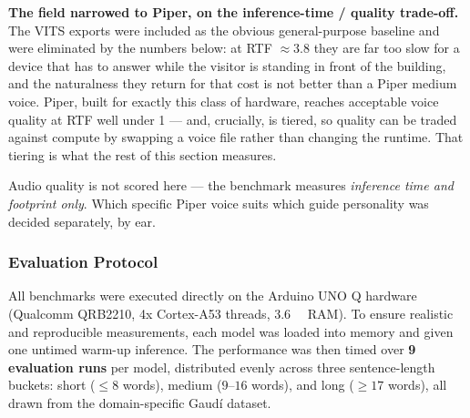 \documentclass[11pt,a4paper]{article}
\begin{document}
\textbf{The field narrowed to Piper, on the inference-time / quality
trade-off.} The VITS exports were included as the obvious general-purpose
baseline and were eliminated by the numbers below: at RTF $\approx 3.8$ they
are far too slow for a device that has to answer while the visitor is standing
in front of the building, and the naturalness they return for that cost is not
better than a Piper medium voice. Piper, built for exactly this class of
hardware, reaches acceptable voice quality at RTF well under 1 --- and,
crucially, is tiered, so quality can be traded against compute by swapping a
voice file rather than changing the runtime. That tiering is what the rest of
this section measures.

Audio quality is not scored here --- the benchmark measures \emph{inference
time and footprint only}. Which specific Piper voice suits which guide
personality was decided separately, by ear.

\subsubsection{Evaluation Protocol}

All benchmarks were executed directly on the Arduino UNO Q hardware (Qualcomm QRB2210, 4x Cortex-A53 threads, \SI{3.6}{\giga\byte} RAM). To ensure realistic and reproducible measurements, each model was loaded into memory and given one untimed warm-up inference. The performance was then timed over \textbf{9 evaluation runs} per model, distributed evenly across three sentence-length buckets: short ($\le 8$ words), medium ($9$--$16$ words), and long ($\ge 17$ words), all drawn from the domain-specific Gaud\'i dataset.
\end{document}
